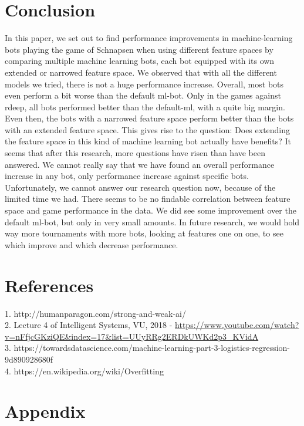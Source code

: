\documentclass[a4paper,11pt]{article}
\begin{document}
\section{Conclusion}
In this paper, we set out to find performance improvements in machine-learning bots  playing the game of Schnapsen when using different feature spaces by comparing multiple machine learning bots, each bot equipped with its own extended or narrowed feature space. We observed that with all the different models we tried, there is not a huge performance increase. Overall, most bots even perform a bit worse than the default ml-bot. Only in the games against rdeep, all bots performed better than the default-ml, with a quite big margin. Even then, the bots with a narrowed feature space perform better than the bots with an extended feature space. This gives rise to the question: Does extending the feature space in this kind of machine learning bot actually have benefits? It seems that after this research, more questions have risen than have been answered. We cannot really say that we have found an overall performance increase in any bot, only performance increase against specific bots. Unfortunately, we cannot answer our research question now, because of the limited time we had. There seems to be no findable correlation between feature space and game performance in the data. We did see some improvement over the default ml-bot, but only in very small amounts. In future research, we would hold way more tournaments with more bots, looking at features one on one, to see which improve and which decrease performance.


\section{References}
1. http://humanparagon.com/strong-and-weak-ai/ \\
2. Lecture 4 of Intelligent Systems, VU, 2018 - \url{https://www.youtube.com/watch?v=nFfjcGKziQE&index=17&list=UUyRRg2ERDkUWKd2p3_KVidA} \\
3. https://towardsdatascience.com/machine-learning-part-3-logistics-regression-9d890928680f \\
4. https://en.wikipedia.org/wiki/Overfitting

\clearpage
\section{Appendix}
\end{document}
